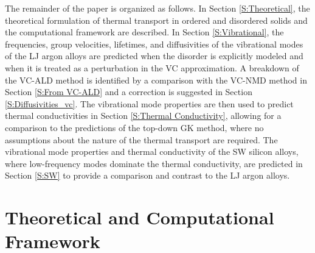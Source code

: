 The remainder of the paper is organized as follows. 
In Section \ref{S:Theoretical}, the theoretical 
formulation of thermal transport in ordered and disordered solids 
and the computational framework are described. 
In Section \ref{S:Vibrational}, the frequencies, 
group velocities, lifetimes, and diffusivities of the 
vibrational modes of the LJ argon alloys are 
predicted when the disorder is explicitly modeled and when it is 
treated as a perturbation in the VC approximation. 
A breakdown of the VC-ALD method is identified by a comparison 
with the VC-NMD method in 
Section \ref{S:From VC-ALD}   
and a correction is suggested in Section \ref{S:Diffusivities_vc}. 
The vibrational 
mode properties are then used to predict thermal conductivities 
in Section \ref{S:Thermal Conductivity}, 
allowing for a comparison to the predictions of the top-down  
GK method, where no assumptions about the nature of the 
thermal transport are required. The vibrational mode properties and 
thermal conductivity of the SW silicon alloys, where low-frequency modes 
dominate the thermal conductivity, are predicted in 
Section \ref{S:SW} to provide a comparison and contrast to the 
LJ argon alloys. 




\section{\label{S:Theoretical}Theoretical and Computational Framework}

